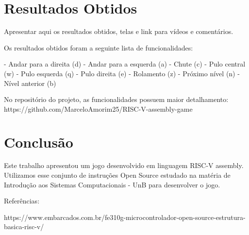 \documentclass[a4paper]{sbgames}
\begin{document}
\section{Resultados Obtidos}
\label{sec:Resultados}

Apresentar aqui os resultados obtidos, telas e link para vídeos e comentários.

Os resultados obtidos foram a seguinte lista de funcionalidades:

- Andar para a direita (d)
- Andar para a esquerda (a)
- Chute (c)
- Pulo central (w)
- Pulo esquerda (q)
- Pulo direita (e)
- Rolamento (z)
- Próximo nível (n)
- Nível anterior (b)

 
No repositório do projeto, as funcionalidades possuem maior detalhamento: https://github.com/MarceloAmorim25/RISC-V-assembly-game
 

\section{Conclusão}
\label{sec:Conclusao}
Este trabalho apresentou um jogo desenvolvido em linguagem RISC-V assembly. Utilizamos esse conjunto de instruções Open Source estudado na matéria de Introdução aos Sistemas Computacionais - UnB para desenvolver o jogo.



Referências: 

https://www.embarcados.com.br/fe310g-microcontrolador-open-source-estrutura-basica-risc-v/




%


\end{document}
